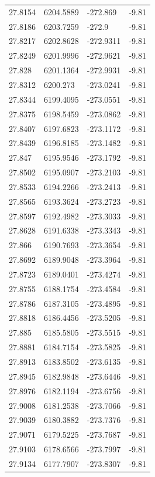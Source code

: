 \begin{table}[H]
\begin{tabular}{llll}
27.8154 & 6204.5889 & -272.869 & -9.81 \\
27.8186 & 6203.7259 & -272.9 & -9.81 \\
27.8217 & 6202.8628 & -272.9311 & -9.81 \\
27.8249 & 6201.9996 & -272.9621 & -9.81 \\
27.828 & 6201.1364 & -272.9931 & -9.81 \\
27.8312 & 6200.273 & -273.0241 & -9.81 \\
27.8344 & 6199.4095 & -273.0551 & -9.81 \\
27.8375 & 6198.5459 & -273.0862 & -9.81 \\
27.8407 & 6197.6823 & -273.1172 & -9.81 \\
27.8439 & 6196.8185 & -273.1482 & -9.81 \\
27.847 & 6195.9546 & -273.1792 & -9.81 \\
27.8502 & 6195.0907 & -273.2103 & -9.81 \\
27.8533 & 6194.2266 & -273.2413 & -9.81 \\
27.8565 & 6193.3624 & -273.2723 & -9.81 \\
27.8597 & 6192.4982 & -273.3033 & -9.81 \\
27.8628 & 6191.6338 & -273.3343 & -9.81 \\
27.866 & 6190.7693 & -273.3654 & -9.81 \\
27.8692 & 6189.9048 & -273.3964 & -9.81 \\
27.8723 & 6189.0401 & -273.4274 & -9.81 \\
27.8755 & 6188.1754 & -273.4584 & -9.81 \\
27.8786 & 6187.3105 & -273.4895 & -9.81 \\
27.8818 & 6186.4456 & -273.5205 & -9.81 \\
27.885 & 6185.5805 & -273.5515 & -9.81 \\
27.8881 & 6184.7154 & -273.5825 & -9.81 \\
27.8913 & 6183.8502 & -273.6135 & -9.81 \\
27.8945 & 6182.9848 & -273.6446 & -9.81 \\
27.8976 & 6182.1194 & -273.6756 & -9.81 \\
27.9008 & 6181.2538 & -273.7066 & -9.81 \\
27.9039 & 6180.3882 & -273.7376 & -9.81 \\
27.9071 & 6179.5225 & -273.7687 & -9.81 \\
27.9103 & 6178.6566 & -273.7997 & -9.81 \\
27.9134 & 6177.7907 & -273.8307 & -9.81 \\

\end{tabular}
\end{table}
